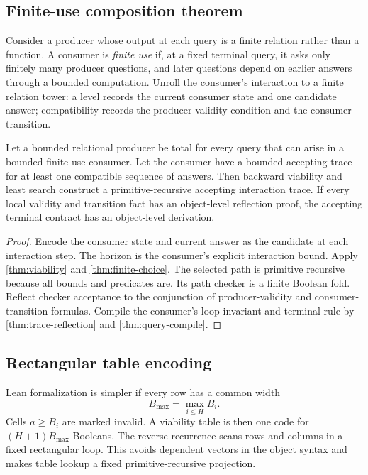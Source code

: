 \subsection{Finite-use composition theorem}

Consider a producer whose output at each query is a finite relation rather than a function.  A consumer is \emph{finite use} if, at a fixed terminal query, it asks only finitely many producer questions, and later questions depend on earlier answers through a bounded computation.  Unroll the consumer's interaction to a finite relation tower: a level records the current consumer state and one candidate answer; compatibility records the producer validity condition and the consumer transition.

\begin{theorem}\label{thm:finite-use}
Let a bounded relational producer be total for every query that can arise in a bounded finite-use consumer.  Let the consumer have a bounded accepting trace for at least one compatible sequence of answers.  Then backward viability and least search construct a primitive-recursive accepting interaction trace.  If every local validity and transition fact has an object-level reflection proof, the accepting terminal contract has an object-level derivation.
\end{theorem}

\begin{proof}
Encode the consumer state and current answer as the candidate at each interaction step.  The horizon is the consumer's explicit interaction bound.  Apply \cref{thm:viability} and \cref{thm:finite-choice}.  The selected path is primitive recursive because all bounds and predicates are.  Its path checker is a finite Boolean fold.  Reflect checker acceptance to the conjunction of producer-validity and consumer-transition formulas.  Compile the consumer's loop invariant and terminal rule by \cref{thm:trace-reflection} and \cref{thm:query-compile}.
\end{proof}

\subsection{Rectangular table encoding}

Lean formalization is simpler if every row has a common width
\[
  B_{\max}=\max_{i\le H}B_i.
\]
Cells \(a\ge B_i\) are marked invalid.  A viability table is then one code for \((H+1)B_{\max}\) Booleans.  The reverse recurrence scans rows and columns in a fixed rectangular loop.  This avoids dependent vectors in the object syntax and makes table lookup a fixed primitive-recursive projection.

